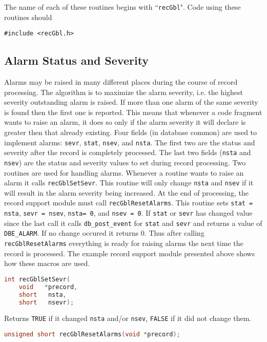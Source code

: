 The name of each of these routines begins with ``\verb|recGbl|".
Code using these routines should
\begin{verbatim}
#include <recGbl.h>
\end{verbatim}

\subsection{Alarm Status and Severity}

Alarms may be raised in many different places during the course of record processing.
The algorithm is to maximize the alarm severity, i.e. the highest severity outstanding alarm is raised.
If more than one alarm of the same severity is found then the first one is reported.
This means that whenever a code fragment wants to raise an alarm, it does so only if the alarm severity it will declare is greater then that already existing.
Four fields (in database common) are used to implement alarms:
\verb|sevr|, \verb|stat|, \verb|nsev|, and \verb|nsta|.
The first two are the status and severity after the record is completely processed.
The last two fields (\verb|nsta| and \verb|nsev|) are the status and severity values to set during record processing.
Two routines are used for handling alarms.
Whenever a routine wants to raise an alarm it calls \verb|recGblSetSevr|.
This routine will only change \verb|nsta| and \verb|nsev| if it will result in the alarm severity being increased.
At the end of processing, the record support module must call \verb|recGblResetAlarms|.
This routine sets \verb|stat = nsta|, \verb|sevr = nsev|, \verb|nsta= 0|, and \verb|nsev = 0|.
If \verb|stat| or \verb|sevr| has changed value since the last call it calls \verb|db_post_event| for \verb|stat| and \verb|sevr| and returns a value of \verb|DBE_ALARM|.
If no change occured it returns 0.
Thus after calling \verb|recGblResetAlarms| everything is ready for raising alarms the next time the record is processed.
The example record support module presented above shows how these macros are used.

\begin{lstlisting}[language=C]
int recGblSetSevr(
    void   *precord,
    short   nsta,
    short   nsevr);
\end{lstlisting}

Returns \verb|TRUE| if it changed \verb|nsta| and/or \verb|nsev|, \verb|FALSE| if it did not change them.

\begin{lstlisting}[language=C]
unsigned short recGblResetAlarms(void *precord);
\end{lstlisting}

